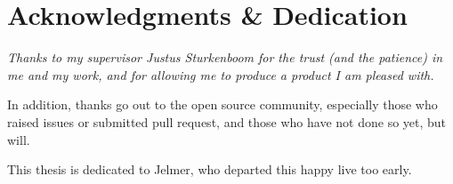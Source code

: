 
\begingroup
  \let\clearpage\relax
  \let\cleardoublepage\relax
  \chapter*{Acknowledgments \& Dedication}

  \itshape
  Thanks to my supervisor Justus Sturkenboom for the trust (and the patience)
    in me and my work, and for allowing me to produce a product I am pleased
    with.

  \medskip
  \noindent In addition, thanks go out to the open source community,
    especially those who raised issues or submitted pull request, and those
    who have not done so yet, but will.

  \medskip
  \noindent This thesis is dedicated to Jelmer, who departed this happy live
    too early.
\endgroup
